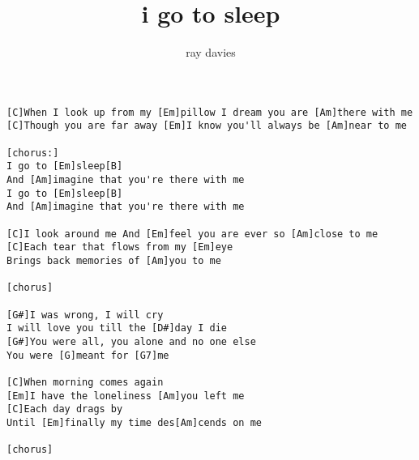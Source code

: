 \author{ray davies}
\title{i go to sleep}
\maketitle
\begin{verbatim}
[C]When I look up from my [Em]pillow I dream you are [Am]there with me
[C]Though you are far away [Em]I know you'll always be [Am]near to me

[chorus:]
I go to [Em]sleep[B]
And [Am]imagine that you're there with me
I go to [Em]sleep[B]
And [Am]imagine that you're there with me

[C]I look around me And [Em]feel you are ever so [Am]close to me
[C]Each tear that flows from my [Em]eye
Brings back memories of [Am]you to me

[chorus]

[G#]I was wrong, I will cry
I will love you till the [D#]day I die
[G#]You were all, you alone and no one else
You were [G]meant for [G7]me

[C]When morning comes again
[Em]I have the loneliness [Am]you left me
[C]Each day drags by
Until [Em]finally my time des[Am]cends on me

[chorus]
\end{verbatim}